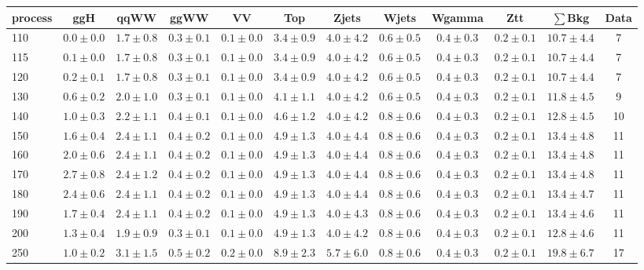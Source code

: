 \begin{table}
{%
 \tiny
 \begin{center}
 \begin{tabular}{l c c c c c c c c c c c }
 \hline
 process & ggH & qqWW & ggWW & VV & Top & Zjets & Wjets & Wgamma & Ztt & $\sum$Bkg & Data \\
 \hline
110 & $0.0\pm0.0$ & $1.7\pm0.8$ & $0.3\pm0.1$ & $0.1\pm0.0$ & $3.4\pm0.9$ & $4.0\pm4.2$ & $0.6\pm0.5$ & $0.4\pm0.3$ & $0.2\pm0.1$ & $10.7\pm4.4$ & 7 \\
115 & $0.1\pm0.0$ & $1.7\pm0.8$ & $0.3\pm0.1$ & $0.1\pm0.0$ & $3.4\pm0.9$ & $4.0\pm4.2$ & $0.6\pm0.5$ & $0.4\pm0.3$ & $0.2\pm0.1$ & $10.7\pm4.4$ & 7 \\
120 & $0.2\pm0.1$ & $1.7\pm0.8$ & $0.3\pm0.1$ & $0.1\pm0.0$ & $3.4\pm0.9$ & $4.0\pm4.2$ & $0.6\pm0.5$ & $0.4\pm0.3$ & $0.2\pm0.1$ & $10.7\pm4.4$ & 7 \\
130 & $0.6\pm0.2$ & $2.0\pm1.0$ & $0.3\pm0.1$ & $0.1\pm0.0$ & $4.1\pm1.1$ & $4.0\pm4.2$ & $0.6\pm0.5$ & $0.4\pm0.3$ & $0.2\pm0.1$ & $11.8\pm4.5$ & 9 \\
140 & $1.0\pm0.3$ & $2.2\pm1.1$ & $0.4\pm0.1$ & $0.1\pm0.0$ & $4.6\pm1.2$ & $4.0\pm4.2$ & $0.8\pm0.6$ & $0.4\pm0.3$ & $0.2\pm0.1$ & $12.8\pm4.5$ & 10 \\
150 & $1.6\pm0.4$ & $2.4\pm1.1$ & $0.4\pm0.2$ & $0.1\pm0.0$ & $4.9\pm1.3$ & $4.0\pm4.4$ & $0.8\pm0.6$ & $0.4\pm0.3$ & $0.2\pm0.1$ & $13.4\pm4.8$ & 11 \\
160 & $2.0\pm0.6$ & $2.4\pm1.1$ & $0.4\pm0.2$ & $0.1\pm0.0$ & $4.9\pm1.3$ & $4.0\pm4.4$ & $0.8\pm0.6$ & $0.4\pm0.3$ & $0.2\pm0.1$ & $13.4\pm4.8$ & 11 \\
170 & $2.7\pm0.8$ & $2.4\pm1.2$ & $0.4\pm0.2$ & $0.1\pm0.0$ & $4.9\pm1.3$ & $4.0\pm4.4$ & $0.8\pm0.6$ & $0.4\pm0.3$ & $0.2\pm0.1$ & $13.4\pm4.8$ & 11 \\
180 & $2.4\pm0.6$ & $2.4\pm1.1$ & $0.4\pm0.2$ & $0.1\pm0.0$ & $4.9\pm1.3$ & $4.0\pm4.4$ & $0.8\pm0.6$ & $0.4\pm0.3$ & $0.2\pm0.1$ & $13.4\pm4.7$ & 11 \\
190 & $1.7\pm0.4$ & $2.4\pm1.1$ & $0.4\pm0.2$ & $0.1\pm0.0$ & $4.9\pm1.3$ & $4.0\pm4.3$ & $0.8\pm0.6$ & $0.4\pm0.3$ & $0.2\pm0.1$ & $13.4\pm4.6$ & 11 \\
200 & $1.3\pm0.4$ & $1.9\pm0.9$ & $0.3\pm0.1$ & $0.1\pm0.0$ & $4.9\pm1.3$ & $4.0\pm4.2$ & $0.8\pm0.6$ & $0.4\pm0.3$ & $0.2\pm0.1$ & $12.8\pm4.6$ & 11 \\
250 & $1.0\pm0.2$ & $3.1\pm1.5$ & $0.5\pm0.2$ & $0.2\pm0.0$ & $8.9\pm2.3$ & $5.7\pm6.0$ & $0.8\pm0.6$ & $0.4\pm0.3$ & $0.2\pm0.1$ & $19.8\pm6.7$ & 17 \\

\end{tabular}
\end{center}}
\end{table}
